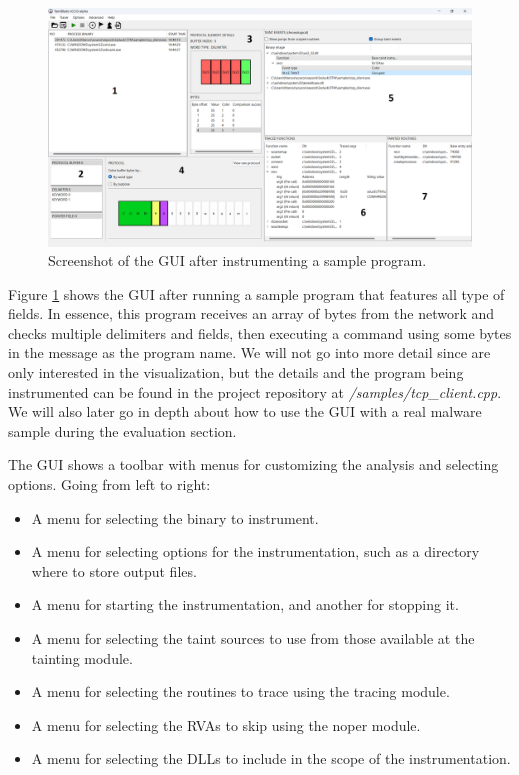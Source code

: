 \documentclass[conference]{IEEEtran}
\begin{document}
\begin{figure}
    \centerline{\includegraphics[width=\textwidth]{images/GUI_full.png}}
    \caption{Screenshot of the GUI after instrumenting a sample program.}
    \label{figure:gui_full}
\end{figure}

Figure \ref{figure:gui_full} shows the GUI after running a sample program that
features all type of fields. In essence, this program receives an array
of bytes from the network and checks multiple delimiters and fields, then
executing a command using some bytes in the message as the program name. 
We will not go into more detail since are only interested in the visualization, 
but the details and the program being instrumented can be found in the project repository 
at \textit{/samples/tcp\_client.cpp}.
We will also later go in depth about how to use the GUI with a real malware sample during the
evaluation section.

The GUI shows a toolbar with menus for customizing the analysis and selecting
options. Going from left to right:
\begin{itemize}
    \item A menu for selecting the binary to instrument.
    \item A menu for selecting options for the instrumentation, such as a directory where
          to store output files.
    \item A menu for starting the instrumentation, and another for stopping it.
    \item A menu for selecting the taint sources to use from those available at the
          tainting module.
    \item A menu for selecting the routines to trace using the tracing module.
    \item A menu for selecting the RVAs to skip using the noper module.
    \item A menu for selecting the DLLs to include in the scope of the instrumentation.
\end{itemize}
\end{document}
